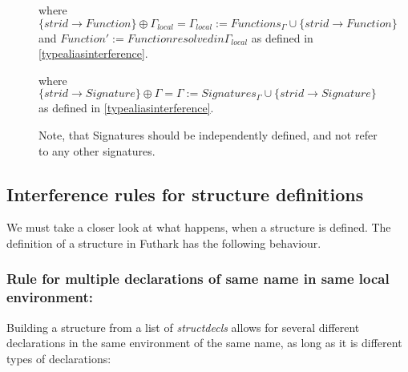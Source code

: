 \begin{figure}\label{Rule2fun}
  \begin{tcolorbox}
    \begin{prooftree}
    \end{prooftree} where
    $\{ strid \to Function \} \oplus \Gamma_{local} = \Gamma_{local} := Functions_{\Gamma} \cup \{strid \to Function\}$ and $Function' := Function resolved in \Gamma_{local}$ as defined in
    \ref{typealiasinterference}.
  \end{tcolorbox}
\end{figure}

\begin{figure}\label{Rule2sig}
  \begin{tcolorbox}
    \begin{prooftree}
    \end{prooftree} where
    $\{ strid \to Signature \} \oplus \Gamma = \Gamma := Signatures_{\Gamma} \cup \{strid \to Signature\}$ as defined in
    \ref{typealiasinterference}.
    
    Note, that Signatures should be independently defined, and not refer to any
    other signatures.
  \end{tcolorbox}
\end{figure}

\subsection{Interference rules for structure definitions}
We must take a closer look at what happens, when a structure is defined.
The definition of a structure in Futhark has the following behaviour.
\subsubsection{Rule for multiple declarations of same name in same local environment:}
Building a structure from a list of \textit{structdecls} allows for several
different declarations in the same environment of the same name, as long as
it is different types of declarations:\\
\\

